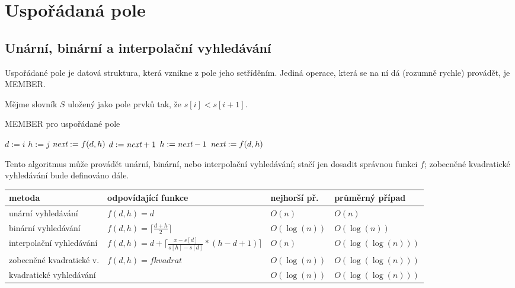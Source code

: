
\chapter{Uspořádaná pole}

\section{Unární, binární a interpolační vyhledávání}

Uspořádané pole je datová struktura, která vznikne z pole jeho
setříděním. Jediná operace, která se na ní dá (rozumně rychle)
provádět, je MEMBER.

Mějme slovník $S$ uložený jako pole prvků tak, že $s[i] < s[i+1]$.

\begin{algorithm}
\caption{MEMBER pro uspořádané pole}
\label{alg:bin.member}
\begin{algorithmic}
\STATE {}
\STATE {}
\STATE $d := i$ 
\STATE $h := j$
\STATE $\<next> := f(d, h)$
		\STATE $d := \<next> + 1$
	\ELSE
		\STATE $h := \<next> - 1$
	\ENDIF
        \STATE $\<next> := f(d, h)$
\ENDWHILE
\STATE {}
\end{algorithmic}
\end{algorithm}

Tento algoritmus může provádět unární, binární, nebo interpolační vyhledávání;
stačí jen dosadit správnou funkci $f$; 
zobecněné kvadratické vyhledávání bude definováno dále.

\hspace{10mm}

\begin{tabular}{|l|l|l|l|}
\hline
\bf{metoda}& \bf{odpovídající funkce}& nejhorší př.& průměrný případ\\
\hline
	unární vyhledávání& 
$f(d,h) = d$&
$O(n)$&
$O(n)$\\
	binární vyhledávání&
$f(d,h) = \lceil \frac{d+h}{2} \rceil$&
$O(\log(n))$&
$O(\log(n))$\\
	interpolační vyhledávání&
$f(d,h) = d + \lceil \frac{x-s[d]}{s[h]-s[d]} * (h-d+1) \rceil$ &
$O(n)$&
$O(\log(\log(n)))$\\
\hline
	zobecněné kvadratické v.&
$f(d,h) = fkvadrat$&
$O(\log(n))$&
$O(\log(\log(n)))$\\
	kvadratické vyhledávání&
$ $&
$O(\log(n))$&
$O(\log(\log(n)))$\\
\hline
\end{tabular}

